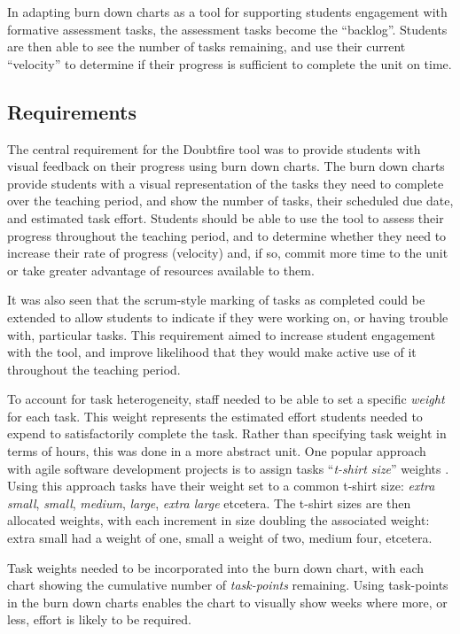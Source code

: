 In adapting burn down charts as a tool for supporting students engagement with formative assessment tasks, the assessment tasks become the ``backlog''. Students are then able to see the number of tasks remaining, and use their current ``velocity'' to determine if their progress is sufficient to complete the unit on time.


\subsection{Requirements} %
\label{sub:doubtfire_requirements}

The central requirement for the Doubtfire tool was to provide students with visual feedback on their progress using burn down charts. The burn down charts provide students with a visual representation of the tasks they need to complete over the teaching period, and show the number of tasks, their scheduled due date, and estimated task effort. Students should be able to use the tool to assess their progress throughout the teaching period, and to determine whether they need to increase their rate of progress (velocity) and, if so, commit more time to the unit or take greater advantage of resources available to them. 

It was also seen that the scrum-style marking of tasks as completed could be extended to allow students to indicate if they were working on, or having trouble with, particular tasks. This requirement aimed to increase student engagement with the tool, and improve likelihood that they would make active use of it throughout the teaching period.

To account for task heterogeneity, staff needed to be able to set a specific \emph{weight} for each task. This weight represents the estimated effort students needed to expend to satisfactorily complete the task. Rather than specifying task weight in terms of hours, this was done in a more abstract unit. One popular approach with agile software development projects is to assign tasks ``\emph{t-shirt size}'' weights \cite{Peixoto:2010}. Using this approach tasks have their weight set to a common t-shirt size: \emph{extra small}, \emph{small}, \emph{medium}, \emph{large}, \emph{extra large} etcetera. The t-shirt sizes are then allocated weights, with each increment in size doubling the associated weight: extra small had a weight of one, small a weight of two, medium four, etcetera.

Task weights needed to be incorporated into the burn down chart, with each chart showing the cumulative number of \emph{task-points} remaining. Using task-points in the burn down charts enables the chart to visually show weeks where more, or less, effort is likely to be required.

